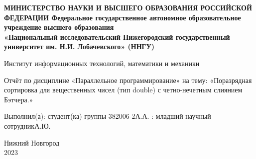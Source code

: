 \documentclass[12pt,a4paper]{article}
\title{}
\author{}
\date{}
\begin{document}
\begin{titlepage}
    \newpage
    \begin{center}
    {\bfseries МИНИСТЕРСТВО НАУКИ И ВЫСШЕГО ОБРАЗОВАНИЯ РОССИЙСКОЙ ФЕДЕРАЦИИ
Федеральное государственное автономное образовательное учреждение
высшего образования
 \\
    «Национальный исследовательский
Нижегородский государственный университет им. Н.И. Лобачевского»
(ННГУ)
}

     Институт информационных технологий, математики и механики \\
    \end{center}

    \vspace{1.2em}

    \begin{center}
    \Large Отчёт по дисциплине \linebreak «Параллельное программирование» \linebreak на тему: \linebreak
«Поразрядная сортировка для вещественных чисел (тип double) с четно-нечетным слиянием Бэтчера.»

    \end{center}

    \vspace{5em}


    \begin{flushright}
                       Выполнил(а):
                       студент(ка) группы 382006-2 А.А.\underline{\hspace{3cm}} \linebreak{}: младший научный сотрудник А.Ю.\underline{\hspace{3cm}} 
    \end{flushright}

    \vspace{\fill}
    
    \begin{center}
    Нижний Новгород\\
    2023
    \end{center}

    \end{titlepage}
    
\maketitle
\end{document}
